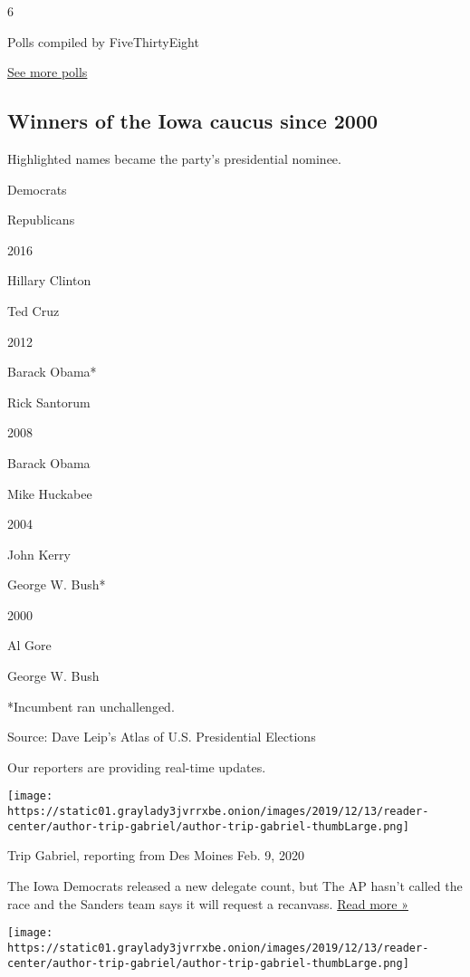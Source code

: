 6

Polls compiled by FiveThirtyEight

\href{https://www.nytimes3xbfgragh.onion/interactive/2020/us/elections/democratic-polls.html?action=click\&module=ELEX_results\&pgtype=Interactive\&region=Component}{See
more polls}

\hypertarget{winners-of-the-iowa-caucus-since-2000}{%
\subsection{Winners of the Iowa caucus since
2000}\label{winners-of-the-iowa-caucus-since-2000}}

Highlighted names became the party's presidential nominee.

Democrats

Republicans

2016

Hillary Clinton

Ted Cruz

2012

Barack Obama*

Rick Santorum

2008

Barack Obama

Mike Huckabee

2004

John Kerry

George W. Bush*

2000

Al Gore

George W. Bush

*Incumbent ran unchallenged.

Source: Dave Leip's Atlas of U.S. Presidential Elections

Our reporters are providing real-time updates.

\texttt{[image: https://static01.graylady3jvrrxbe.onion/images/2019/12/13/reader-center/author-trip-gabriel/author-trip-gabriel-thumbLarge.png]}

Trip Gabriel, reporting from Des Moines Feb. 9, 2020

The Iowa Democrats released a new delegate count, but The AP hasn't
called the race and the Sanders team says it will request a recanvass.
\href{https://www.nytimes3xbfgragh.onion/2020/02/09/us/politics/iowa-caucuses-democrats.html?action=click\&module=ELEX_results\&pgtype=Interactive\&region=ReporterUpdates}{Read
more »}

\texttt{[image: https://static01.graylady3jvrrxbe.onion/images/2019/12/13/reader-center/author-trip-gabriel/author-trip-gabriel-thumbLarge.png]}

